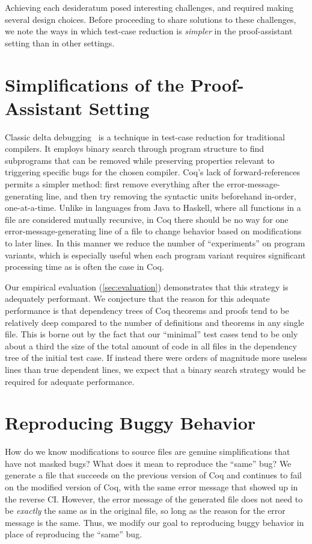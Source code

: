 \documentclass[a4paper,USenglish,cleveref,autoref,thm-restate]{lipics-v2021}
\begin{document}
Achieving each desideratum posed interesting challenges, and required making several design choices.
Before proceeding to share solutions to these challenges, we note the ways in which test-case reduction is \emph{simpler} in the proof-assistant setting than in other settings.


\section{Simplifications of the Proof-Assistant Setting}\label{sec:easier}

Classic delta debugging~\cite{Zeller2002} is a technique in test-case reduction for traditional compilers. 
It employs binary search through program structure to find subprograms that can be removed while preserving properties relevant to triggering specific bugs for the chosen compiler.
Coq's lack of forward-references permits a simpler method: first remove everything after the error-message-generating line, and then try removing the syntactic units beforehand in-order, one-at-a-time.
Unlike in languages from Java to Haskell, where all functions in a file are considered mutually recursive, in Coq there should be no way for one error-message-generating line of a file to change behavior based on modifications to later lines.
In this manner we reduce the number of ``experiments'' on program variants, which is especially useful when each program variant requires significant processing time as is often the case in Coq.

Our empirical evaluation (\autoref{sec:evaluation}) demonstrates that this strategy is adequately performant.
We conjecture that the reason for this adequate performance is that dependency trees of Coq theorems and proofs tend to be relatively deep compared to the number of definitions and theorems in any single file.
This is borne out by the fact that our ``minimal'' test cases tend to be only about a third the size of the total amount of code in all files in the dependency tree of the initial test case.
If instead there were orders of magnitude more useless lines than true dependent lines, we expect that a binary search strategy would be required for adequate performance.

\section{Reproducing Buggy Behavior}\label{sec:error-messages}

How do we know modifications to source files are genuine simplifications that have not masked bugs?
What does it mean to reproduce the ``same'' bug?
We generate a file that succeeds on the previous version of Coq and continues to fail on the modified version of Coq, with the same error message that showed up in the reverse CI.
However, the error message of the generated file does not need to be \emph{exactly} the same as in the original file, so long as the reason for the error message is the same.
Thus, we modify our goal to reproducing buggy behavior in place of reproducing the ``same'' bug.
\end{document}
